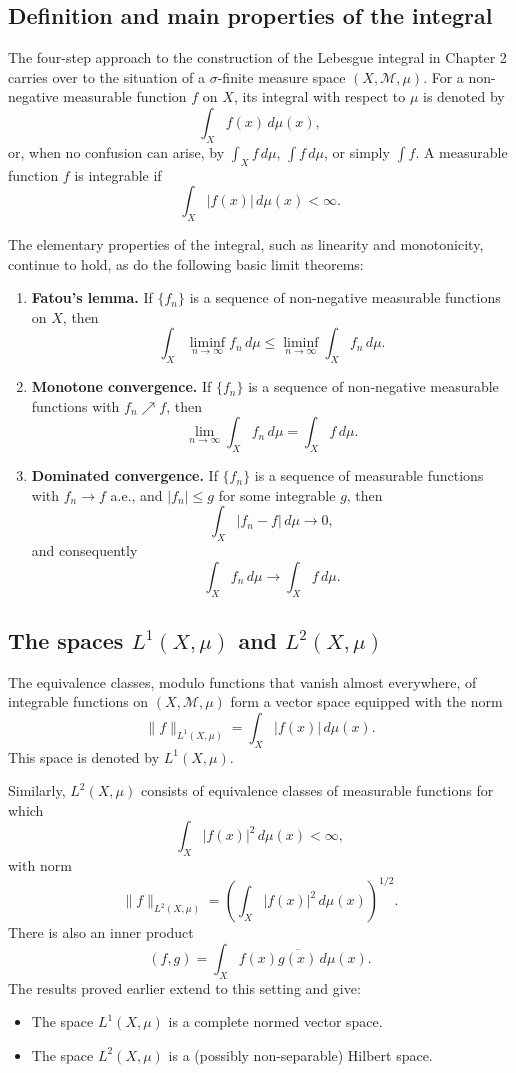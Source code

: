 \documentclass[11pt,openany]{book}
\begin{document}
\subsection*{Definition and main properties of the integral}

The four-step approach to the construction of the Lebesgue integral in Chapter 2 carries over to the situation of a $\sigma$-finite measure space $(X,\mathcal M,\mu)$. For a non-negative measurable function $f$ on $X$, its integral with respect to $\mu$ is denoted by
\[
\int_X f(x)\,d\mu(x),
\]
or, when no confusion can arise, by $\int_X f\,d\mu$, $\int f\,d\mu$, or simply $\int f$. A measurable function $f$ is integrable if
\[
\int_X|f(x)|\,d\mu(x)<\infty.
\]

The elementary properties of the integral, such as linearity and monotonicity, continue to hold, as do the following basic limit theorems:
\begin{enumerate}
\item[(i)] \textbf{Fatou's lemma.} If $\{f_n\}$ is a sequence of non-negative measurable functions on $X$, then
\[
\int_X\liminf_{n\to\infty}f_n\,d\mu
\leq
\liminf_{n\to\infty}\int_X f_n\,d\mu.
\]
\item[(ii)] \textbf{Monotone convergence.} If $\{f_n\}$ is a sequence of non-negative measurable functions with $f_n\nearrow f$, then
\[
\lim_{n\to\infty}\int_X f_n\,d\mu=\int_X f\,d\mu.
\]
\item[(iii)] \textbf{Dominated convergence.} If $\{f_n\}$ is a sequence of measurable functions with $f_n\to f$ a.e., and $|f_n|\leq g$ for some integrable $g$, then
\[
\int_X|f_n-f|\,d\mu\to0,
\]
and consequently
\[
\int_X f_n\,d\mu\to\int_X f\,d\mu.
\]
\end{enumerate}

\subsection*{The spaces $L^1(X,\mu)$ and $L^2(X,\mu)$}

The equivalence classes, modulo functions that vanish almost everywhere, of integrable functions on $(X,\mathcal M,\mu)$ form a vector space equipped with the norm
\begin{equation}
\|f\|_{L^1(X,\mu)}=\int_X|f(x)|\,d\mu(x).
\tag{4}
\end{equation}
This space is denoted by $L^1(X,\mu)$.

Similarly, $L^2(X,\mu)$ consists of equivalence classes of measurable functions for which
\[
\int_X|f(x)|^2\,d\mu(x)<\infty,
\]
with norm
\begin{equation}
\|f\|_{L^2(X,\mu)}=
\left(\int_X|f(x)|^2\,d\mu(x)\right)^{1/2}.
\tag{5}
\end{equation}
There is also an inner product
\[
(f,g)=\int_X f(x)\overline{g(x)}\,d\mu(x).
\]
The results proved earlier extend to this setting and give:
\begin{itemize}
\item The space $L^1(X,\mu)$ is a complete normed vector space.
\item The space $L^2(X,\mu)$ is a (possibly non-separable) Hilbert space.
\end{itemize}
\end{document}
